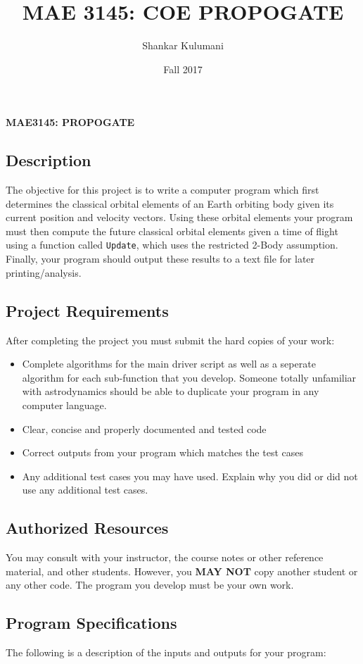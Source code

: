 \documentclass[11pt, reqno]{article}    %
\title{MAE 3145: COE PROPOGATE}
\author{Shankar Kulumani}
\date{Fall 2017}                          %
\begin{document}
\begin{center}
{\Large \textbf{MAE3145: PROPOGATE}}
\end{center}
\subsection*{Description}

The objective for this project is to write a computer program which first determines the classical orbital elements of an Earth orbiting body given its current position and velocity vectors. 
Using these orbital elements your program must then compute the future classical orbital elements given a time of flight using a function called \texttt{Update}, which uses the restricted 2-Body assumption.
Finally, your program should output these results to a text file for later printing/analysis. 

\subsection*{Project Requirements}
After completing the project you must submit the hard copies of your work:
\begin{itemize}
    \item Complete algorithms for the main driver script as well as a seperate algorithm for each sub-function that you develop.
        Someone totally unfamiliar with astrodynamics should be able to duplicate your program in any computer language.
    \item Clear, concise and properly documented and tested code
    \item Correct outputs from your program which matches the test cases
    \item Any additional test cases you may have used. 
        Explain why you did or did not use any additional test cases.
\end{itemize}

\subsection*{Authorized Resources}
You may consult with your instructor, the course notes or other reference material, and other students. 
However, you \textbf{MAY NOT} copy another student or any other code. 
The program you develop must be your own work.

\subsection*{Program Specifications}
The following is a description of the inputs and outputs for your program:
\end{document}
